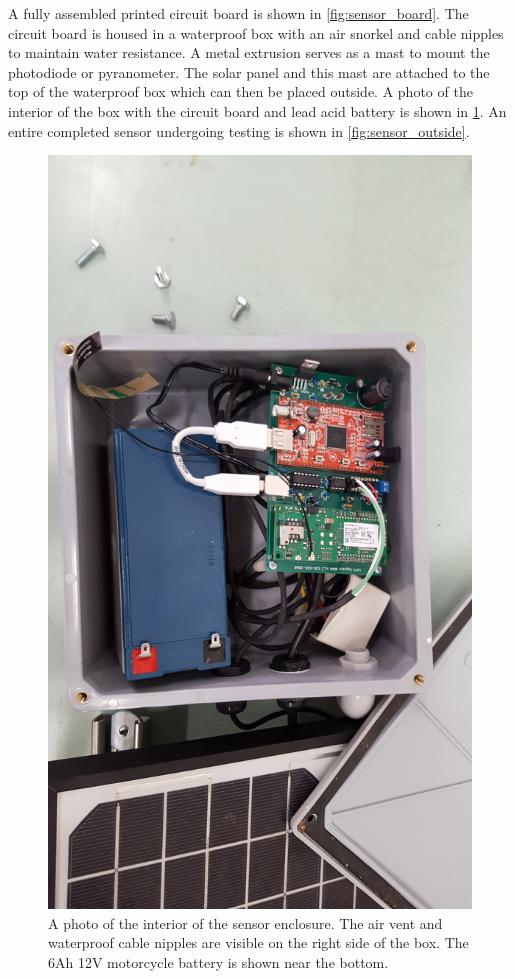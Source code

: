A fully assembled printed circuit board is shown in
\cref{fig:sensor_board}.
The circuit board is housed in a waterproof box with an air snorkel
and cable nipples to maintain water resistance.
A metal extrusion serves as a mast to mount the photodiode or
pyranometer.
The solar panel and this mast are attached to the top of the
waterproof box which can then be placed outside.
A photo of the interior of the box with the circuit board and lead
acid battery is shown in \cref{fig:sensor_int}.
An entire completed sensor undergoing testing is shown in
\cref{fig:sensor_outside}.

\begin{figure}[ht]
  \includegraphics[width=\textwidth]{figs/sensor_interior.jpg}
\caption[Interior of the sensor enclosure]{A photo of the interior of
  the sensor enclosure. The air vent and waterproof cable nipples are
  visible on the right side of the box. The 6Ah 12V motorcycle battery
  is shown near the bottom.}
\label{fig:sensor_int}
\end{figure}

